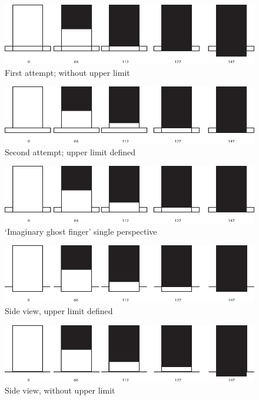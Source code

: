 \begin{figure}
\includegraphics[width=\linewidth]{./resources/Asset 4.pdf}
\caption{First attempt; without upper limit}\label{fig:Asset4}
\end{figure}

\begin{figure}
\includegraphics[width=\linewidth]{./resources/Asset 5.pdf}
\caption{Second attempt; upper limit defined}\label{fig:Asset5}
\end{figure}

\begin{figure}
\includegraphics[width=\linewidth]{./resources/Asset 6.pdf}
\caption{`Imaginary ghost finger' single perspective}\label{fig:Asset6}
\end{figure}

\begin{figure}
\includegraphics[width=\linewidth]{./resources/Asset 7.pdf}
\caption{Side view, upper limit defined}\label{fig:Asset7}
\end{figure}

\begin{figure}
\includegraphics[width=\linewidth]{./resources/Asset 9.pdf}
\caption{Side view, without upper limit}\label{fig:Asset9}
\end{figure}
